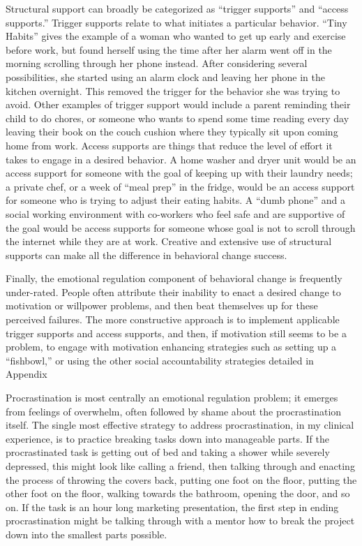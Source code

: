 \documentclass[12pt,letterpaper]{article}
\begin{document}
Structural support can broadly be categorized as “trigger supports” and “access supports.” Trigger supports relate to what initiates a particular behavior. “Tiny Habits” gives the example of a woman who wanted to get up early and exercise before work, but found herself using the time after her alarm went off in the morning scrolling through her phone instead. After considering several possibilities, she started using an alarm clock and leaving her phone in the kitchen overnight. This removed the trigger for the behavior she was trying to avoid. Other examples of trigger support would include a parent reminding their child to do chores, or someone who wants to spend some time reading every day leaving their book on the couch cushion where they typically sit upon coming home from work. Access supports are things that reduce the level of effort it takes to engage in a desired behavior. A home washer and dryer unit would be an access support for someone with the goal of keeping up with their laundry needs; a private chef, or a week of “meal prep” in the fridge, would be an access support for someone who is trying to adjust their eating habits. A “dumb phone” and a social working environment with co-workers who feel safe and are supportive of the goal would be access supports for someone whose goal is not to scroll through the internet while they are at work. Creative and extensive use of structural supports can make all the difference in behavioral change success.

Finally, the emotional regulation component of behavioral change is frequently under-rated. People often attribute their inability to enact a desired change to motivation or willpower problems, and then beat themselves up for these perceived failures. The more constructive approach is to implement applicable trigger supports and access supports, and then, if motivation still seems to be a problem, to engage with motivation enhancing strategies such as setting up a “fishbowl,” or using the other social accountability strategies detailed in Appendix \todo{}

Procrastination is most centrally an emotional regulation problem; it emerges from feelings of overwhelm, often followed by shame about the procrastination itself. The single most effective strategy to address procrastination, in my clinical experience, is to practice breaking tasks down into manageable parts. If the procrastinated task is getting out of bed and taking a shower while severely depressed, this might look like calling a friend, then talking through and enacting the process of throwing the covers back, putting one foot on the floor, putting the other foot on the floor, walking towards the bathroom, opening the door, and so on. If the task is an hour long marketing presentation, the first step in ending procrastination might be talking through with a mentor how to break the project down into the smallest parts possible.
\end{document}
